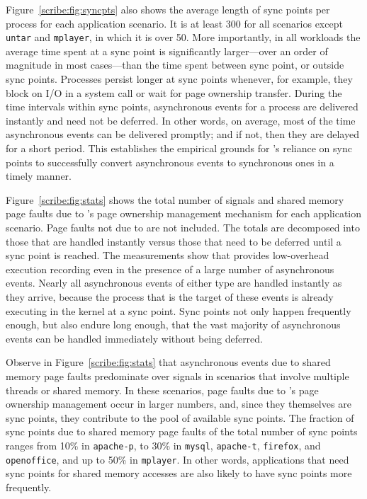 Figure~\ref{scribe:fig:syncpts} also shows the average length of sync points
per process for each application scenario. It is at least 300\us{} for
all scenarios except {\tt untar} and {\tt mplayer}, in which it is
over 50\us{}. More importantly, in all workloads the average time
spent at a sync point is significantly larger---over an order of
magnitude in most cases---than the time spent between sync point, or
outside sync points. Processes persist longer at sync points whenever,
for example, they block on I/O in a system call or wait for page
ownership transfer. During the time intervals within sync points,
asynchronous events for a process are delivered instantly and need not
be deferred. In other words, on average, most of the time asynchronous
events can be delivered promptly; and if not, then they are delayed
for a short period.  This establishes the empirical grounds for
\scribe{}'s reliance on sync points to successfully convert
asynchronous events to synchronous ones in a timely manner.

Figure~\ref{scribe:fig:stats} shows the total number of signals and shared
memory page faults due to \scribe{}'s page ownership management mechanism
for each application scenario.  Page faults not due to \scribe{} are
not included.  The totals are decomposed into those that are handled
instantly versus those that need to be deferred until a sync point is
reached.  The measurements show that \scribe{} provides
low-overhead execution recording even in the presence of a large
number of asynchronous events.  
Nearly all asynchronous events of
either type are handled instantly as they arrive, because the process
that is the target of these events is already executing in the
kernel at a sync point.  Sync points not only happen frequently
enough, but also endure long enough, that the vast majority of
asynchronous events can be handled immediately without being deferred.

Observe in Figure~\ref{scribe:fig:stats} that asynchronous events due to
shared memory page faults predominate over signals in scenarios that
involve multiple threads or shared memory. In these scenarios, page
faults due to \scribe{}'s page ownership management occur in larger
numbers, and, since they themselves are sync points, they contribute
to the pool of available sync points. The fraction of sync points due
to shared memory page faults of the total number of sync points ranges
from 10\% in {\tt apache-p}, to 30\% in {\tt mysql}, {\tt apache-t},
{\tt firefox}, and {\tt openoffice}, and up to 50\% in {\tt mplayer}.
In other words, applications that need sync points for shared memory
accesses are also likely to have sync points more frequently.

